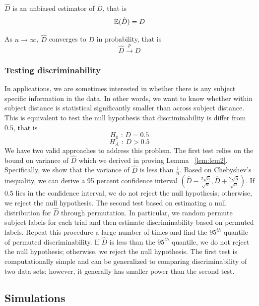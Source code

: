 \documentclass{article}
\begin{document}
\begin{lem}	
	$\hat{D}$ is an unbiased estimator of $D$, that is
	\[ \mathbb{E}(\hat{D}) = D\]
\end{lem}

\begin{lem}	
	As $n \rightarrow \infty$, $\hat{D}$ converges to $D$ in probability, that is
	\[\hat{D} \overset{p}{\rightarrow} D \]
	\label{lem:lem2}
\end{lem}

\subsubsection{Testing discriminability}
In applications, we are sometimes interested in whether there is any subject specific information in the data. In other words, we want to know whether within subject distance is statistical significantly smaller than across subject distance. This is equivalent to test the null hypothesis that discriminability is differ from $0.5$, that is
\[ H_0 \text{ : } D = 0.5 \]
\[ H_A \text{ : } D > 0.5 \]
We have two valid approaches to address this problem. The first test relies on the bound on variance of $\hat{D}$ which we derived in proving Lemma ~\ref{lem:lem2}. Specifically, we show that the variance of $\hat{D}$ is less than $\frac{1}{n}$. Based on Chebyshev's inequality, we can derive a 95 percent confidence interval $(\hat{D}-\frac{2\sqrt{5}}{\sqrt{n}},\hat{D}+\frac{2\sqrt{5}}{\sqrt{n}})$. If $0.5$ lies in the confidence interval, we do not reject the null hypothesis; otherwise, we reject the null hypothesis. The second test based on estimating a null distribution for $\hat{D}$ through permutation. In particular, we random permute subject labels for each trial and then estimate discriminability based on permuted labels. Repeat this procedure a large number of times and find the $95^{th}$ quantile of permuted discriminability. If $\hat{D}$ is less than the $95^{th}$ quantile, we do not reject the null hypothesis; otherwise, we reject the null hypothesis. The first test is computationally simple and can be generalized to comparing discriminability of two data sets; however, it generally has smaller power than the second test.


\subsection{Simulations}
\end{document}
